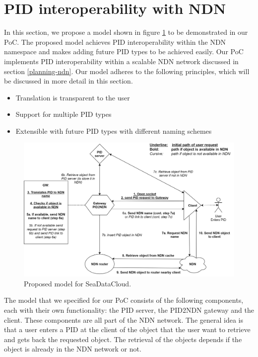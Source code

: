 \section{PID interoperability with NDN}\label{pid-poc}

In this section, we propose a model shown in figure \ref{fig:sdc_model} to be demonstrated in our PoC. The proposed model achieves PID interoperability within the NDN namespace and makes adding future PID types to be achieved easily. Our PoC implements PID interoperability within a scalable NDN network discussed in section \ref{planning-ndn}. Our model adheres to the following principles, which will be discussed in more detail in this section.

\begin{itemize}
    \item{Translation is transparent to the user}
    \item{Support for multiple PID types}
    \item{Extensible with future PID types with different naming schemes}
\end{itemize}

\begin{figure}[H]
\centering
\includegraphics[width=\textwidth]{Images/PIDNDN_edit_final_5.png}
\caption{Proposed model for SeaDataCloud.}
\label{fig:sdc_model}
\end{figure}

The model that we specified for our PoC consists of the following components, each with their own functionality: the PID server, the PID2NDN gateway and the client. These components are all part of the NDN network. The general idea is that a user enters a PID at the client of the object that the user want to retrieve and gets back the requested object. The retrieval of the objects depends if the object is already in the NDN network or not.  

